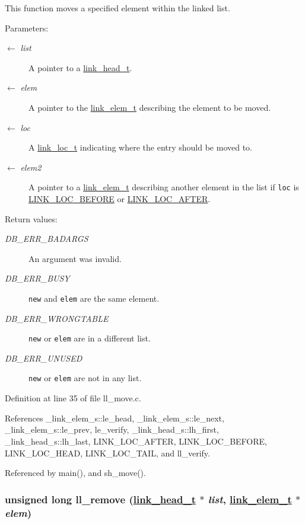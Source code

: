 This function moves a specified element within the linked list.

\begin{Desc}
\item[Parameters:]
\begin{description}
\item[\mbox{$\leftarrow$} {\em list}]A pointer to a \hyperlink{group__dbprim__link_ga0}{link\_\-head\_\-t}. \item[\mbox{$\leftarrow$} {\em elem}]A pointer to the \hyperlink{group__dbprim__link_ga1}{link\_\-elem\_\-t} describing the element to be moved. \item[\mbox{$\leftarrow$} {\em loc}]A \hyperlink{group__dbprim__link_ga4}{link\_\-loc\_\-t} indicating where the entry should be moved to. \item[\mbox{$\leftarrow$} {\em elem2}]A pointer to a \hyperlink{group__dbprim__link_ga1}{link\_\-elem\_\-t} describing another element in the list if {\tt loc} is \hyperlink{group__dbprim__link_gga28a135}{LINK\_\-LOC\_\-BEFORE} or \hyperlink{group__dbprim__link_gga28a136}{LINK\_\-LOC\_\-AFTER}.\end{description}
\end{Desc}
\begin{Desc}
\item[Return values:]
\begin{description}
\item[{\em DB\_\-ERR\_\-BADARGS}]An argument was invalid. \item[{\em DB\_\-ERR\_\-BUSY}]{\tt new} and {\tt elem} are the same element. \item[{\em DB\_\-ERR\_\-WRONGTABLE}]{\tt new} or {\tt elem} are in a different list. \item[{\em DB\_\-ERR\_\-UNUSED}]{\tt new} or {\tt elem} are not in any list.\end{description}
\end{Desc}


Definition at line 35 of file ll\_\-move.c.

References \_\-link\_\-elem\_\-s::le\_\-head, \_\-link\_\-elem\_\-s::le\_\-next, \_\-link\_\-elem\_\-s::le\_\-prev, le\_\-verify, \_\-link\_\-head\_\-s::lh\_\-first, \_\-link\_\-head\_\-s::lh\_\-last, LINK\_\-LOC\_\-AFTER, LINK\_\-LOC\_\-BEFORE, LINK\_\-LOC\_\-HEAD, LINK\_\-LOC\_\-TAIL, and ll\_\-verify.

Referenced by main(), and sh\_\-move().\hypertarget{group__dbprim__link_ga8}{
\subsubsection[ll\_\-remove]{\setlength{\rightskip}{0pt plus 5cm}unsigned long ll\_\-remove (\hyperlink{struct__link__head__s}{link\_\-head\_\-t} $\ast$ {\em list}, \hyperlink{struct__link__elem__s}{link\_\-elem\_\-t} $\ast$ {\em elem})}}
\label{group__dbprim__link_ga8}


